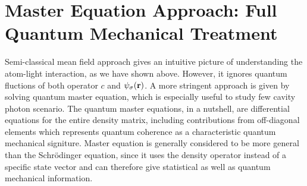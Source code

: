 \documentclass[journal,article,accept,moreauthors,pdftex,12pt,a4paper]{mdpi}
\begin{document}
\section{Master Equation Approach: Full Quantum Mechanical Treatment } \label{master}

Semi-classical mean field approach gives an intuitive picture of understanding the atom-light interaction, as we have shown above. However, it ignores quantum fluctions of both operator $c$ and $\psi_\sigma({\bf r})$. A more stringent approach is given by solving quantum master equation, which is especially useful to study few cavity photon scenario. The quantum master equations, in a nutshell, are differential equations for the entire density matrix, including contributions from off-diagonal elements which represents quantum coherence as a characteristic quantum mechanical signiture. Master equation is generally considered to be more general than the Schr\"{o}dinger equation, since it uses the density operator instead of a specific state vector and can therefore give statistical as well as quantum mechanical information. 
\end{document}

